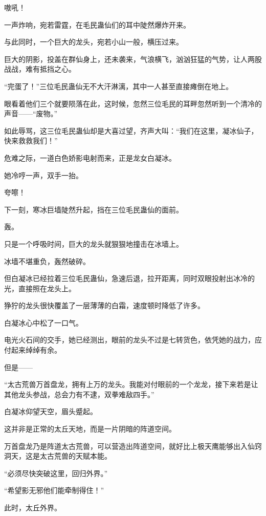 
\begin{this_body}

嗷吼！

一声炸响，宛若雷霆，在毛民蛊仙们的耳中陡然爆炸开来。

与此同时，一个巨大的龙头，宛若小山一般，横压过来。

巨大的阴影，投盖在群仙身上，还未袭来，气浪横飞，汹汹狂猛的气势，让人两股战战，难有抵挡之心。

“完蛋了！”三位毛民蛊仙无不大汗淋漓，其中一人甚至直接瘫倒在地上。

眼看着他们三个就要陨落在此，这时候，忽然三位毛民的耳畔忽然听到一个清冷的声音——“废物。”

如此辱骂，这三位毛民蛊仙却是大喜过望，齐声大叫：“我们在这里，凝冰仙子，快来救救我们！”

危难之际，一道白色娇影电射而来，正是龙女白凝冰。

她冷哼一声，双手一抬。

夸嚓！

下一刻，寒冰巨墙陡然升起，挡在三位毛民蛊仙的面前。

轰。

只是一个呼吸时间，巨大的龙头就狠狠地撞击在冰墙上。

冰墙不堪重负，轰然破碎。

但白凝冰已经拉着三位毛民蛊仙，急速后退，拉开距离，同时双眼投射出冰冷的光，直接照在龙头上。

狰狞的龙头很快覆盖了一层薄薄的白霜，速度顿时降低了许多。

白凝冰心中松了一口气。

电光火石间的交手，她已经测出，眼前的龙头不过是七转货色，依凭她的战力，应付起来绰绰有余。

但是——

“太古荒兽万首盘龙，拥有上万的龙头。我能对付眼前的一个龙龙，接下来若是让其他龙头参战，总会力有不逮，双拳难敌四手。”

白凝冰仰望天空，眉头蹙起。

这并非是正常的太丘天地，而是一片阴暗的阵道空间。

万首盘龙乃是阵道太古荒兽，可以营造出阵道空间，就好比上极天鹰能够出入仙窍洞天，这是太古荒兽的天赋本能。

“必须尽快突破这里，回归外界。”

“希望影无邪他们能牵制得住！”

此时，太丘外界。


\end{this_body}
